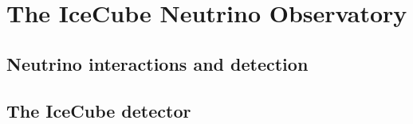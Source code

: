 \chapter{The IceCube Neutrino Observatory}

\section{Neutrino interactions and detection}

\section{The IceCube detector}

\begingroup
\graphicspath{{results/HESE_Final_Paper/}}

\endgroup
